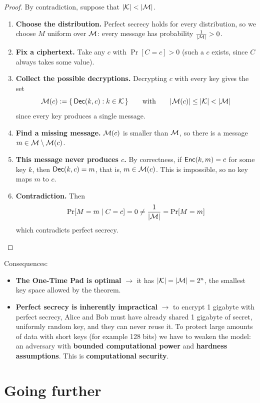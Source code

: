 \begin{proof}
  By contradiction, suppose that $|\mathcal{K}| < |\mathcal{M}|$.
  \begin{enumerate}
    \item \textbf{Choose the distribution.} Perfect secrecy holds for every distribution, so we choose $M$ uniform over $\mathcal{M}$: every message has probability $\frac{1}{|\mathcal{M}|} > 0$.
    \item \textbf{Fix a ciphertext.} Take any $c$ with $\Pr[C = c] > 0$ (such a $c$ exists, since $C$ always takes some value).
    \item \textbf{Collect the possible decryptions.} Decrypting $c$ with every key gives the set
    \[
      \mathcal{M}(c) := \{\, \mathsf{Dec}(k, c) : k \in \mathcal{K} \,\} \qquad \text{with} \qquad |\mathcal{M}(c)| \leq |\mathcal{K}| < |\mathcal{M}|
    \]
    since every key produces a single message.
    \item \textbf{Find a missing message.} $\mathcal{M}(c)$ is smaller than $\mathcal{M}$, so there is a message $m \in \mathcal{M} \setminus \mathcal{M}(c)$.
    \item \textbf{This message never produces $c$.} By correctness, if $\mathsf{Enc}(k, m) = c$ for some key $k$, then $\mathsf{Dec}(k, c) = m$, that is, $m \in \mathcal{M}(c)$. This is impossible, so no key maps $m$ to $c$.
    \item \textbf{Contradiction.} Then
    \[
      \Pr[M = m \mid C = c] = 0 \neq \frac{1}{|\mathcal{M}|} = \Pr[M = m]
    \]
    which contradicts perfect secrecy. \qedhere
  \end{enumerate}
\end{proof}

Consequences:
\begin{itemize}
  \item \textbf{The One-Time Pad is optimal} $\to$ it has $|\mathcal{K}| = |\mathcal{M}| = 2^n$, the smallest key space allowed by the theorem.
  \item \textbf{Perfect secrecy is inherently impractical} $\to$ to encrypt 1 gigabyte with perfect secrecy, Alice and Bob must have already shared 1 gigabyte of secret, uniformly random key, and they can never reuse it. To protect large amounts of data with short keys (for example 128 bits) we have to weaken the model: an adversary with \textbf{bounded computational power} and \textbf{hardness assumptions}. This is \textbf{computational security}.
\end{itemize}

\section{Going further}\label{sec:going-further}

